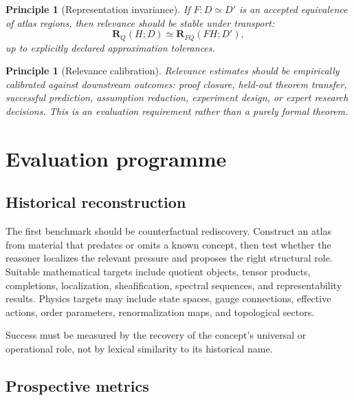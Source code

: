 \documentclass[11pt]{article}
\newtheorem{principle}[definition]{Principle}
\begin{document}
\begin{principle}[Representation invariance]
If $F:D\simeq D'$ is an accepted equivalence of atlas regions, then relevance should be stable under
transport:
\begin{equation}
\mathbf{R}_Q(H;D)
\simeq
\mathbf{R}_{FQ}(FH;D'),
\end{equation}
up to explicitly declared approximation tolerances.
\end{principle}

\begin{principle}[Relevance calibration]
Relevance estimates should be empirically calibrated against downstream outcomes: proof closure,
held-out theorem transfer, successful prediction, assumption reduction, experiment design, or expert
research decisions. This is an evaluation requirement rather than a purely formal theorem.
\end{principle}

\section{Evaluation programme}

\subsection{Historical reconstruction}

The first benchmark should be counterfactual rediscovery. Construct an atlas from material that
predates or omits a known concept, then test whether the reasoner localizes the relevant pressure and
proposes the right structural role. Suitable mathematical targets include quotient objects, tensor
products, completions, localization, sheafification, spectral sequences, and representability results.
Physics targets may include state spaces, gauge connections, effective actions, order parameters,
renormalization maps, and topological sectors.

Success must be measured by the recovery of the concept's universal or operational role, not by lexical
similarity to its historical name.

\subsection{Prospective metrics}
\end{document}
